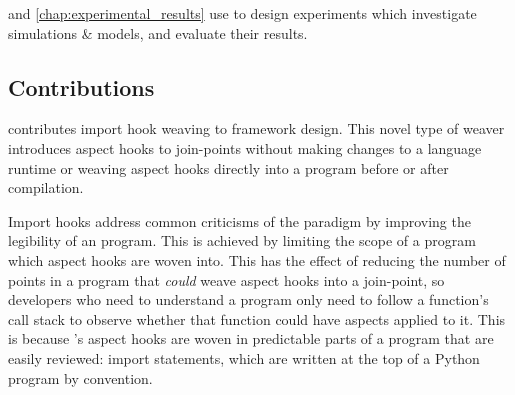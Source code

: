  and \cref{chap:experimental_results} use \pdsfthree
to design experiments which investigate \aspectoriented{} simulations \& models,
and evaluate their results.

\subsection{Contributions}
\label{pdsf3_contributions_summarised}

\pdsfthree contributes import hook weaving to \aop{} framework design. This
novel type of weaver introduces aspect hooks to join-points without making
changes to a language runtime or weaving aspect hooks directly into a program
before or after compilation. 

Import hooks address common criticisms of the \aspectoriented{} paradigm by
improving the legibility of an \aop{} program. This is achieved by limiting the
scope of a program which aspect hooks are woven into. This has the effect of
reducing the number of points in a program that \emph{could} weave aspect hooks
into a join-point, so developers who need to understand a program only need to
follow a function's call stack to observe whether that function could have
aspects applied to it. This is because \pdsfthree{}'s aspect hooks are woven in
predictable parts of a program that are easily reviewed: import statements,
which are written at the top of a Python program by convention.




